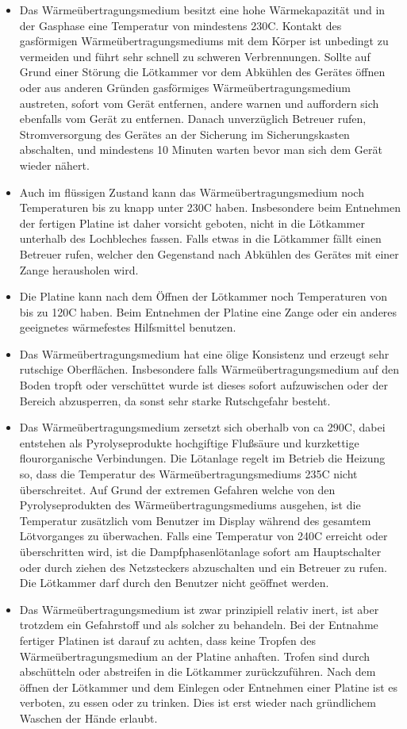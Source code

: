 \documentclass{\basedir/fablab-document}
\begin{document}
	\begin{itemize}
	\item Das Wärmeübertragungsmedium besitzt eine hohe Wärmekapazität und in der Gasphase eine Temperatur von mindestens 230C. Kontakt des gasförmigen Wärmeübertragungsmediums mit dem Körper ist unbedingt zu vermeiden und führt sehr schnell zu schweren Verbrennungen. Sollte auf Grund einer Störung die Lötkammer vor dem Abkühlen des Gerätes öffnen oder aus anderen Gründen gasförmiges Wärmeübertragungsmedium austreten, sofort vom Gerät entfernen, andere warnen und auffordern sich ebenfalls vom Gerät zu entfernen. Danach unverzüglich Betreuer rufen, Stromversorgung des Gerätes an der Sicherung im Sicherungskasten abschalten, und mindestens 10 Minuten warten bevor man sich dem Gerät wieder nähert.
	\item Auch im flüssigen Zustand kann das Wärmeübertragungsmedium noch Temperaturen bis zu knapp unter 230C haben. Insbesondere beim Entnehmen der fertigen Platine ist daher vorsicht geboten, nicht in die Lötkammer unterhalb des Lochbleches fassen. Falls etwas in die Lötkammer fällt einen Betreuer rufen, welcher den Gegenstand nach Abkühlen des Gerätes mit einer Zange herausholen wird.
	\item Die Platine kann nach dem Öffnen der Lötkammer noch Temperaturen von bis zu 120C haben. Beim Entnehmen der Platine eine Zange oder ein anderes geeignetes wärmefestes Hilfsmittel benutzen.
	\item Das Wärmeübertragungsmedium hat eine ölige Konsistenz und erzeugt sehr rutschige Oberflächen. Insbesondere falls Wärmeübertragungsmedium auf den Boden tropft oder verschüttet wurde ist dieses sofort aufzuwischen oder der Bereich abzusperren, da sonst sehr starke Rutschgefahr besteht.
	\item Das Wärmeübertragungsmedium zersetzt sich oberhalb von ca 290C, dabei entstehen als Pyrolyseprodukte hochgiftige Flußsäure und kurzkettige flourorganische Verbindungen. Die Lötanlage regelt im Betrieb die Heizung so, dass die Temperatur des Wärmeübertragungsmediums 235C nicht überschreitet. Auf Grund der extremen Gefahren welche von den Pyrolyseprodukten des Wärmeübertragungsmediums ausgehen, ist die Temperatur zusätzlich vom Benutzer im Display während des gesamtem Lötvorganges zu überwachen. Falls eine Temperatur von 240C erreicht oder überschritten wird, ist die Dampfphasenlötanlage sofort am Hauptschalter oder durch ziehen des Netzsteckers abzuschalten und ein Betreuer zu rufen. Die Lötkammer darf durch den Benutzer nicht geöffnet werden.
	\item Das Wärmeübertragungsmedium ist zwar prinzipiell relativ inert, ist aber trotzdem ein Gefahrstoff und als solcher zu behandeln. Bei der Entnahme fertiger Platinen ist darauf zu achten, dass keine Tropfen des Wärmeübertragungsmedium an der Platine anhaften. Trofen sind durch abschütteln oder abstreifen in die Lötkammer zurückzuführen. Nach dem öffnen der Lötkammer und dem Einlegen oder Entnehmen einer Platine ist es verboten, zu essen oder zu trinken. Dies ist erst wieder nach gründlichem Waschen der Hände erlaubt. 
	\end{itemize}
	
\end{document}

